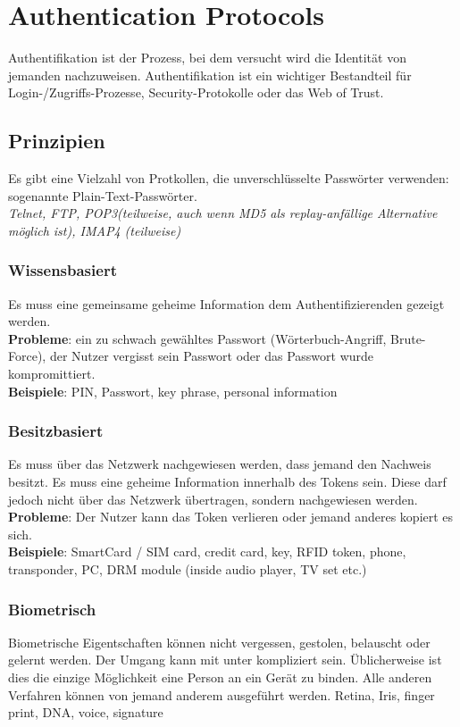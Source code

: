 \documentclass{article} %
\begin{document}
\section{Authentication Protocols}
Authentifikation ist der Prozess, bei dem versucht wird die Identität von jemanden nachzuweisen. Authentifikation ist ein wichtiger Bestandteil für Login-/Zugriffs-Prozesse, Security-Protokolle oder das Web of Trust.

\subsection{Prinzipien}
Es gibt eine Vielzahl von Protkollen, die unverschlüsselte Passwörter verwenden: sogenannte Plain-Text-Passwörter.\\
\textit{Telnet, FTP, POP3(teilweise, auch wenn MD5 als replay-anfällige Alternative möglich ist), IMAP4 (teilweise)}

\subsubsection{Wissensbasiert} 
Es muss eine gemeinsame geheime Information dem Authentifizierenden gezeigt werden.\\ \textbf{Probleme}: ein zu schwach gewähltes Passwort (Wörterbuch-Angriff, Brute-Force), der Nutzer vergisst sein Passwort oder das Passwort wurde kompromittiert.\\
\textbf{Beispiele}: PIN, Passwort, key phrase, personal information

\subsubsection{Besitzbasiert} 
Es muss über das Netzwerk nachgewiesen werden, dass jemand den Nachweis besitzt. Es muss eine geheime Information innerhalb des Tokens sein. Diese darf jedoch nicht über das Netzwerk übertragen, sondern nachgewiesen werden. \\
\textbf{Probleme}: Der Nutzer kann das Token verlieren oder jemand anderes kopiert es sich.\\
\textbf{Beispiele}: SmartCard / SIM card, credit card, key, RFID token, phone, transponder, PC, DRM module (inside audio player, TV set etc.) 

\subsubsection{Biometrisch} 
Biometrische Eigentschaften können nicht vergessen, gestolen, belauscht oder gelernt werden. Der Umgang kann mit unter kompliziert sein. Üblicherweise ist dies die einzige Möglichkeit eine Person an ein Gerät zu binden. Alle anderen Verfahren können von jemand anderem ausgeführt werden.
 Retina, Iris, finger print, DNA, voice, signature
 
\end{document}

